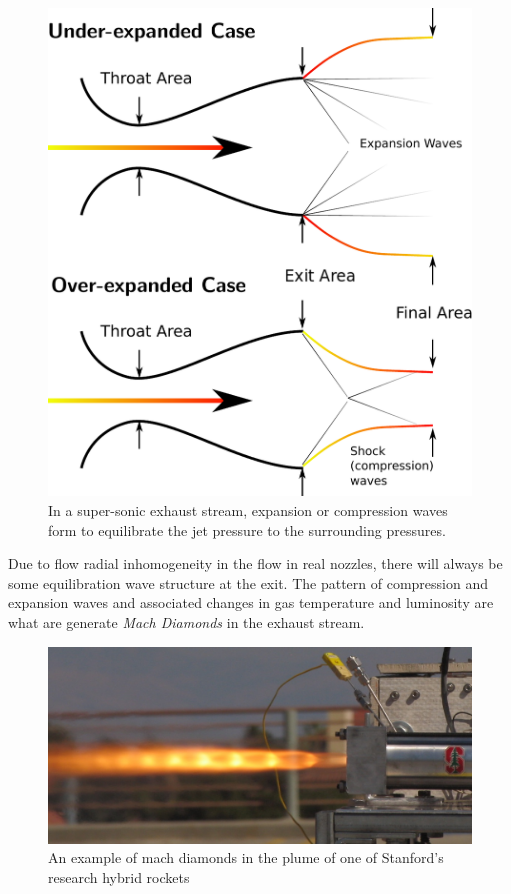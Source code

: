 \documentclass[twocolumn]{memoir} %
\begin{document}
\begin{figure}[h]
    \includegraphics[width=0.9\columnwidth]{overExpanded.pdf}
    \caption{In a super-sonic exhaust stream, expansion or compression waves form to
    equilibrate the jet pressure to the surrounding pressures.}
\end{figure}

Due to flow radial inhomogeneity in the flow in real nozzles, there will always be some
equilibration wave structure at the exit.  The pattern of compression and expansion waves
and associated changes in gas temperature and luminosity are what are generate \emph{Mach
Diamonds} in the exhaust stream.

\begin{figure}[h]
    \includegraphics[width=0.9\columnwidth]{mach_diamonds}
    \caption{An example of mach diamonds in the plume of one of Stanford's research
    hybrid rockets}
\end{figure}
\end{document}
